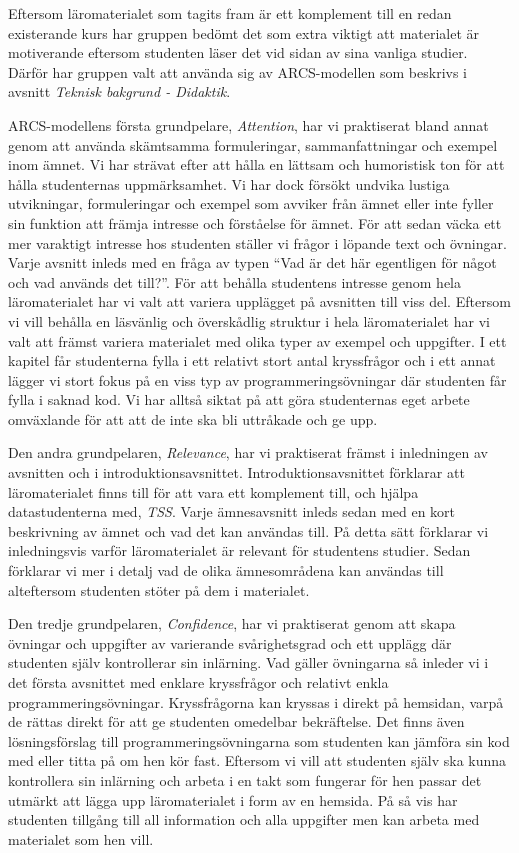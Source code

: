 \documentclass[]{article}
\begin{document}
Eftersom läromaterialet som tagits fram är ett komplement till en redan existerande kurs har gruppen
bedömt det som extra viktigt att materialet är motiverande eftersom studenten läser det vid sidan av
sina vanliga studier. Därför har gruppen valt att använda sig av ARCS-modellen som beskrivs i avsnitt
\textit{Teknisk bakgrund - Didaktik}.

ARCS-modellens första grundpelare, \textit{Attention}, har vi praktiserat bland annat genom att använda
skämtsamma formuleringar, sammanfattningar och exempel inom ämnet. Vi har strävat efter att hålla en
lättsam och humoristisk ton för att hålla studenternas uppmärksamhet. Vi har dock försökt undvika
lustiga utvikningar, formuleringar och exempel som avviker från ämnet eller inte fyller sin funktion
att främja intresse och förståelse för ämnet. För att sedan väcka ett mer varaktigt intresse hos
studenten ställer vi frågor i löpande text och övningar. Varje avsnitt inleds med en fråga av typen
“Vad är det här egentligen för något och vad används det till?”. För att behålla studentens intresse
genom hela läromaterialet har vi valt att variera upplägget på avsnitten till viss del. Eftersom vi
vill behålla en läsvänlig och överskådlig struktur i hela läromaterialet har vi valt att främst variera
materialet med olika typer av exempel och uppgifter. I ett kapitel får studenterna fylla i ett relativt
stort antal kryssfrågor och i ett annat lägger vi stort fokus på en viss typ av programmeringsövningar
där studenten får fylla i saknad kod. Vi har alltså siktat på att göra studenternas eget arbete
omväxlande för att att de inte ska bli uttråkade och ge upp.

Den andra grundpelaren, \textit{Relevance}, har vi praktiserat främst i inledningen av avsnitten och i
introduktionsavsnittet. Introduktionsavsnittet förklarar att läromaterialet finns till för att vara ett
komplement till, och hjälpa datastudenterna med, \textit{TSS}. Varje ämnesavsnitt inleds sedan med en kort
beskrivning av ämnet och vad det kan användas till. På detta sätt förklarar vi inledningsvis varför
läromaterialet är relevant för studentens studier. Sedan förklarar vi mer i detalj vad de olika
ämnesområdena kan användas till alteftersom studenten stöter på dem i materialet.

Den tredje grundpelaren, \textit{Confidence}, har vi praktiserat genom att skapa övningar och uppgifter
av varierande svårighetsgrad och ett upplägg där studenten själv kontrollerar sin inlärning. Vad gäller
övningarna så inleder vi i det första avsnittet med enklare kryssfrågor och relativt enkla
programmeringsövningar. Kryssfrågorna kan kryssas i direkt på hemsidan, varpå de rättas direkt för att
ge studenten omedelbar bekräftelse. Det finns även lösningsförslag till programmeringsövningarna som
studenten kan jämföra sin kod med eller titta på om hen kör fast. Eftersom vi vill att studenten själv
ska kunna kontrollera sin inlärning och arbeta i en takt som fungerar för hen passar det utmärkt att
lägga upp läromaterialet i form av en hemsida. På så vis har studenten tillgång till all information och
alla uppgifter men kan arbeta med materialet som hen vill.
\end{document}
